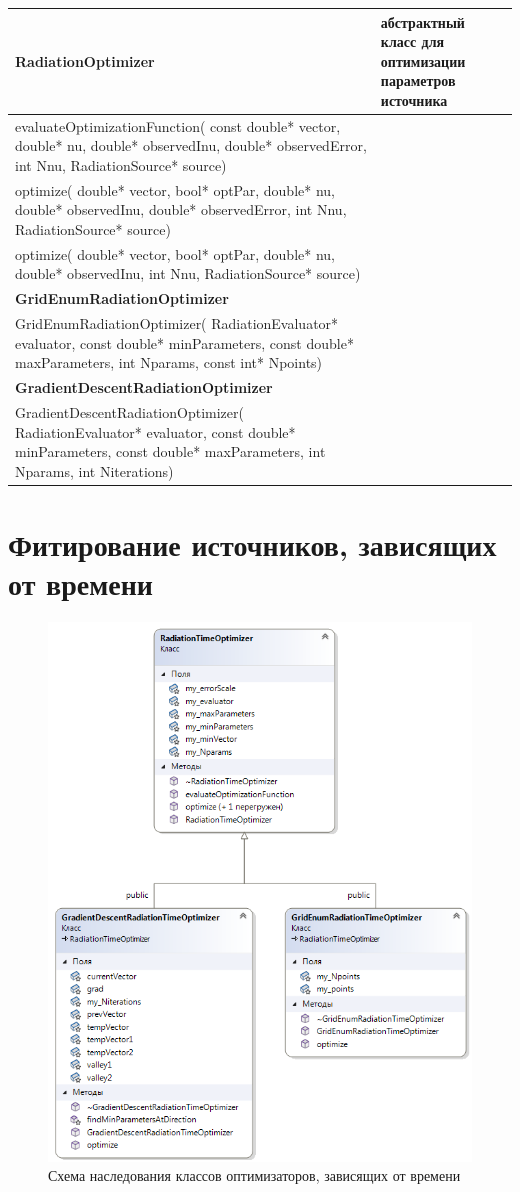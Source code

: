 \begin{small}
	\label{RadiationOptimizerMethods}
	\begin{xtabular}{|p{0.5\textwidth}|p{0.5\textwidth}|}
		\hline
		\textbf{RadiationOptimizer} & абстрактный класс для оптимизации параметров источника \\
		\hline
		evaluateOptimizationFunction( const double* vector, double* nu, double* observedInu, double* observedError, int Nnu, RadiationSource* source) & \\
		\hline
		optimize( double* vector, bool* optPar, double* nu, double* observedInu, double* observedError, int Nnu, RadiationSource* source) & \\
		\hline
		optimize( double* vector, bool* optPar, double* nu, double* observedInu, int Nnu, RadiationSource* source) & \\
		\hline
		\textbf{GridEnumRadiationOptimizer} & \\
		\hline
		GridEnumRadiationOptimizer( RadiationEvaluator* evaluator, const double* minParameters, const double* maxParameters, int Nparams, const int* Npoints) & \\
		\hline
		\textbf{GradientDescentRadiationOptimizer} & \\
		\hline
		GradientDescentRadiationOptimizer( RadiationEvaluator* evaluator, const double* minParameters, const double* maxParameters, int Nparams, int Niterations) & \\
		\hline		
	\end{xtabular}
\end{small}

\section{Фитирование источников, зависящих от времени}
\begin{figure}
	\centering
	\includegraphics[width=10.5 cm]{./fig/radiationOptimizerTime.png} 
	\caption{Схема наследования классов оптимизаторов, зависящих от времени}
	\label{radiationOptimizerTime}
\end{figure}
